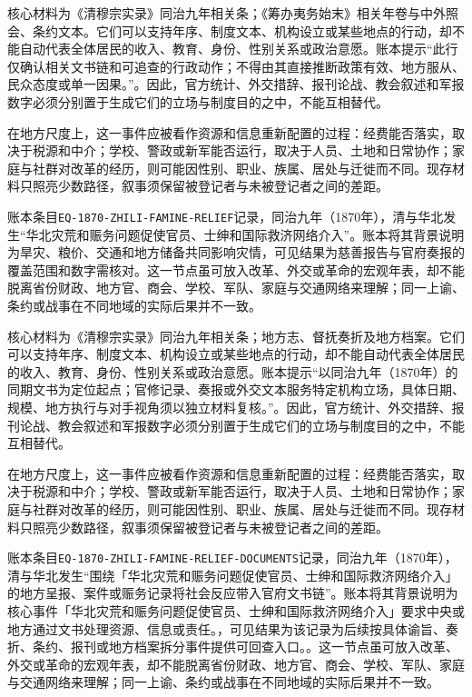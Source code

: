核心材料为《清穆宗实录》同治九年相关条；《筹办夷务始末》相关年卷与中外照会、条约文本。它们可以支持年序、制度文本、机构设立或某些地点的行动，却不能自动代表全体居民的收入、教育、身份、性别关系或政治意愿。账本提示“此行仅确认相关文书链和可追查的行政动作；不得由其直接推断政策有效、地方服从、民众态度或单一因果。”。因此，官方统计、外交措辞、报刊论战、教会叙述和军报数字必须分别置于生成它们的立场与制度目的之中，不能互相替代。

在地方尺度上，这一事件应被看作资源和信息重新配置的过程：经费能否落实，取决于税源和中介；学校、警政或新军能否运行，取决于人员、土地和日常协作；家庭与社群对改革的经历，则可能因性别、职业、族属、居处与迁徙而不同。现存材料只照亮少数路径，叙事须保留被登记者与未被登记者之间的差距。

账本条目\texttt{EQ-1870-ZHILI-FAMINE-RELIEF}记录，同治九年（1870年），清与华北发生“华北灾荒和赈务问题促使官员、士绅和国际救济网络介入”。账本将其背景说明为旱灾、粮价、交通和地方储备共同影响灾情，可见结果为慈善报告与官府奏报的覆盖范围和数字需核对。这一节点虽可放入改革、外交或革命的宏观年表，却不能脱离省份财政、地方官、商会、学校、军队、家庭与交通网络来理解；同一上谕、条约或战事在不同地域的实际后果并不一致。

核心材料为《清穆宗实录》同治九年相关条；地方志、督抚奏折及地方档案。它们可以支持年序、制度文本、机构设立或某些地点的行动，却不能自动代表全体居民的收入、教育、身份、性别关系或政治意愿。账本提示“以同治九年（1870年）的同期文书为定位起点；官修记录、奏报或外交文本服务特定机构立场，具体日期、规模、地方执行与对手视角须以独立材料复核。”。因此，官方统计、外交措辞、报刊论战、教会叙述和军报数字必须分别置于生成它们的立场与制度目的之中，不能互相替代。

在地方尺度上，这一事件应被看作资源和信息重新配置的过程：经费能否落实，取决于税源和中介；学校、警政或新军能否运行，取决于人员、土地和日常协作；家庭与社群对改革的经历，则可能因性别、职业、族属、居处与迁徙而不同。现存材料只照亮少数路径，叙事须保留被登记者与未被登记者之间的差距。

账本条目\texttt{EQ-1870-ZHILI-FAMINE-RELIEF-DOCUMENTS}记录，同治九年（1870年），清与华北发生“围绕「华北灾荒和赈务问题促使官员、士绅和国际救济网络介入」的地方呈报、案件或赈务记录将社会反应带入官府文书链”。账本将其背景说明为核心事件「华北灾荒和赈务问题促使官员、士绅和国际救济网络介入」要求中央或地方通过文书处理资源、信息或责任。，可见结果为该记录为后续按具体谕旨、奏折、条约、报刊或地方档案拆分事件提供可回查入口。。这一节点虽可放入改革、外交或革命的宏观年表，却不能脱离省份财政、地方官、商会、学校、军队、家庭与交通网络来理解；同一上谕、条约或战事在不同地域的实际后果并不一致。

